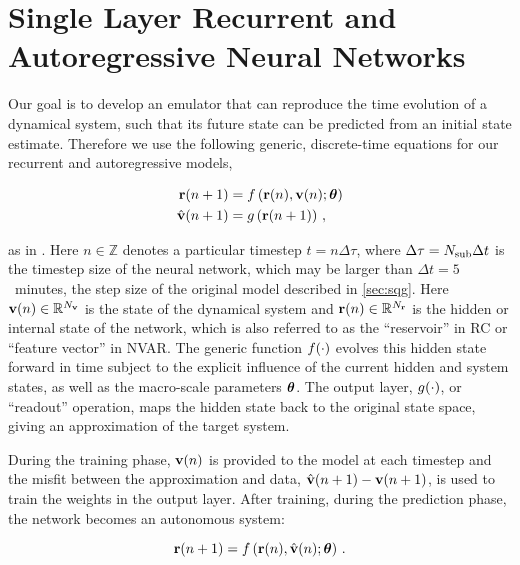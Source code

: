 \section{Single Layer Recurrent and Autoregressive Neural Networks}
\label{sec:rnn-architecture}

Our goal is to develop an emulator that can reproduce the time evolution of a
dynamical system, such that its future state can be predicted from an initial
state estimate.
Therefore we use the following generic, discrete-time equations for our
recurrent and autoregressive models,
\begin{linenomath*}\begin{equation}
    \begin{aligned}
        \mathbf{r}(n+1) &= f\left(
            \mathbf{r}(n), \mathbf{v}(n); \bm{\theta}
            \right) \\
        \hat{\mathbf{v}}(n+1) &= g \left( \mathbf{r}(n+1) \right) \, ,
    \end{aligned}
    \label{eq:rnn}
\end{equation}\end{linenomath*}
as in \citet{goodfellow_sequence_2016}.
Here $n\in\mathbb{Z}$ denotes a particular timestep $t = n\Delta \tau$,
where $\Delta\tau = N_\text{sub}\Delta t$ is the timestep size of the neural network,
which may be larger than $\Delta t=5$~minutes, the step size of the original model described in
\cref{sec:sqg}.
Here
$\mathbf{v}(n)\in\mathbb{R}^{N_{\mathbf{v}}}$ is the state of the dynamical system and
$\mathbf{r}(n)\in\mathbb{R}^{N_{\mathbf{r}}}$ is the hidden or internal state of the network,
which is also referred to as the ``reservoir'' in RC or ``feature vector'' in
NVAR.
The generic function $f(\cdot)$ evolves this hidden state forward in
time subject to the explicit
influence of the current hidden and system states, as well as the macro-scale
parameters $\bm{\theta}$.
The output layer,
$g(\cdot)$, or ``readout'' operation,
maps the hidden state back to the original state space, giving an
approximation of the target system.

During the training phase, $\mathbf{v}(n)$ is provided to the model at each timestep
and the misfit between the approximation and data,
$\hat{\mathbf{v}}(n+1) - \mathbf{v}(n+1)$, is used to train the weights in the output
layer.
After training, during the prediction phase, the network becomes an autonomous
system:
\begin{linenomath*}\begin{equation*}
    \mathbf{r}(n+1) = f\left(
        \mathbf{r}(n), \hat{\mathbf{v}}(n); \bm{\theta}\right) \, .
\end{equation*}\end{linenomath*}

